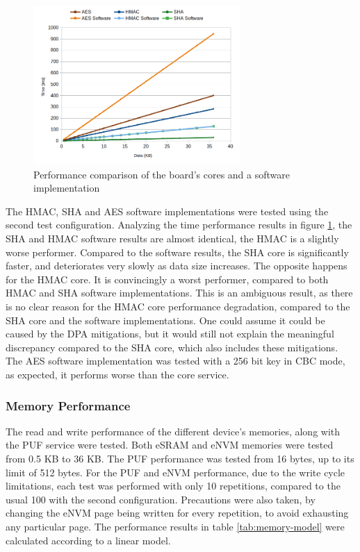 \begin{figure}[h!]
	\centering
	\includegraphics[width=0.7\textwidth]{./Images/software-core-time.png}
	\caption{Performance comparison of the board's cores and a software implementation}
	\label{fig:performance:software-core-time}
\end{figure}

The HMAC, SHA and AES software implementations were tested using the second test configuration.
Analyzing the time performance results in figure \ref{fig:performance:software-core-time}, the SHA and HMAC software results are almost identical, the HMAC is a slightly worse performer. Compared to the software results, the SHA core is significantly faster, and deteriorates very slowly as data size increases. The opposite happens for the HMAC core. It is convincingly a worst performer, compared to both HMAC and SHA software implementations. 
This is an ambiguous result, as there is no clear reason for the HMAC core performance degradation, compared to the SHA core and the software implementations. One could assume it could be caused by the DPA mitigations, but it would still not explain the meaningful discrepancy compared to the SHA core, which also includes these mitigations.
The AES software implementation was tested with a 256 bit key in CBC mode, as expected, it performs worse than the core service.

\subsubsection{Memory Performance}\label{chap:evaluation:services:memory}

The read and write performance of the different device's memories, along with the PUF service were tested. Both eSRAM and eNVM memories were tested from 0.5 KB to 36 KB. The PUF performance was tested from 16 bytes, up to its limit of 512 bytes. For the PUF and eNVM performance, due to the write cycle limitations, each test was performed with only 10 repetitions, compared to the usual 100 with the second configuration. Precautions were also taken, by changing the eNVM page being written for every repetition, to avoid exhausting any particular page.
The performance results in table \ref{tab:memory-model} were calculated according to a linear model.

